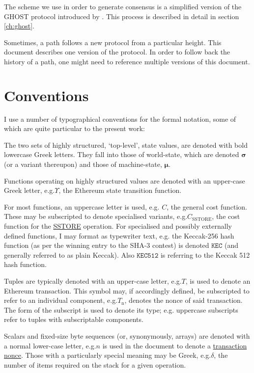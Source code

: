 \documentclass[9pt,oneside]{amsart}
\makeatletter
\newcommand*\eg{e.g.\@\xspace}
\makeatother
\begin{document}
\begin{multicols}{2}
The scheme we use in order to generate consensus is a simplified version of the GHOST protocol introduced by \cite{cryptoeprint:2013:881}. This process is described in detail in section \ref{ch:ghost}.

Sometimes, a path follows a new protocol from a particular height.  This document describes one version of the protocol.  In order to follow back the history of a path, one might need to reference multiple versions of this document.

\section{Conventions}\label{ch:conventions}

I use a number of typographical conventions for the formal notation, some of which are quite particular to the present work:

The two sets of highly structured, `top-level', state values, are denoted with bold lowercase Greek letters. They fall into those of world-state, which are denoted $\boldsymbol{\sigma}$ (or a variant thereupon) and those of machine-state, $\boldsymbol{\mu}$.

Functions operating on highly structured values are denoted with an upper-case Greek letter, \eg \hyperlink{Upsilon_state_transition}{$\Upsilon$}, the Ethereum state transition function.

For most functions, an uppercase letter is used, e.g. $C$, the general cost function. These may be subscripted to denote specialised variants, \eg \hyperlink{C__SSTORE}{$C_\text{SSTORE}$}, the cost function for the \hyperlink{SSTORE}{{\tiny SSTORE}} operation. For specialised and possibly externally defined functions, I may format as typewriter text, \eg the Keccak-256 hash function (as per the winning entry to the SHA-3 contest) is denoted $\texttt{KEC}$ (and generally referred to as plain Keccak). Also $\texttt{KEC512}$ is referring to the Keccak 512 hash function.

Tuples are typically denoted with an upper-case letter, \eg $T$, is used to denote an Ethereum transaction. This symbol may, if accordingly defined, be subscripted to refer to an individual component, \eg \hyperlink{transaction_nonce}{$T_{\mathrm{n}}$}, denotes the nonce of said transaction. The form of the subscript is used to denote its type; \eg uppercase subscripts refer to tuples with subscriptable components.

Scalars and fixed-size byte sequences (or, synonymously, arrays) are denoted with a normal lower-case letter, \eg $n$ is used in the document to denote a \hyperlink{transaction_nonce}{transaction nonce}. Those with a particularly special meaning may be Greek, \eg $\delta$, the number of items required on the stack for a given operation.


\end{multicols}
\end{document}
